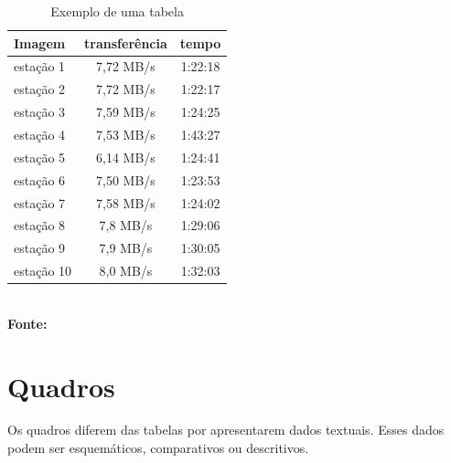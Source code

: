 \begin{table}[htb]
	\centering
	\caption{\hspace{0.1cm} Exemplo de uma tabela}
	\vspace{-0.3cm} %
	\label{tab:tabela1}
	\begin{tabular}{l|c|c}
  \hline
    \textbf{Imagem}	& \textbf{transferência} & \textbf{tempo} \\
    \hline
     estação 1	& 7,72 MB/s &  1:22:18 \\
     estação 2	& 7,72 MB/s &  1:22:17 \\
     estação 3	& 7,59 MB/s & 1:24:25 \\
     estação 4  & 7,53 MB/s & 1:43:27 \\
     estação 5	& 6,14 MB/s  &  1:24:41 \\
     estação 6  &  7,50 MB/s & 1:23:53 \\
     estação 7  & 7,58 MB/s  &  1:24:02 \\
     estação 8  & 7,8 MB/s  &  1:29:06 \\
     estação 9  & 7,9 MB/s  &  1:30:05 \\
     estação 10 & 8,0 MB/s  &  1:32:03 \\
     \hline
 \end{tabular}
 	\vspace{.1cm}  %
	\small
	{\footnotesize\\ \textbf{Fonte: \cite{monog-fabio}}}
\end{table}

\section{\hspace{-0.3cm}Quadros}

Os quadros diferem das tabelas por apresentarem dados textuais.
Esses dados podem ser esquemáticos, comparativos ou descritivos.

\vspace{0.7cm}

